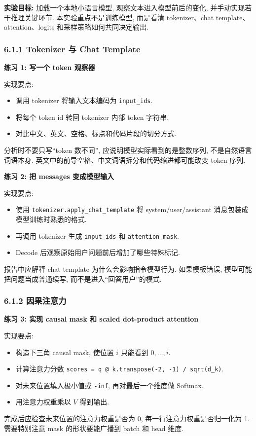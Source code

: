 \documentclass{../../nndlcourse}
\begin{document}
\textbf{实验目标: }加载一个本地小语言模型, 观察文本进入模型前后的变化, 并手动实现若干推理关键环节. 本实验重点不是训练模型, 而是看清 tokenizer、chat template、attention、logits 和采样策略如何共同决定输出.

\subsubsection*{6.1.1 Tokenizer 与 Chat Template}

\textbf{练习 1: 写一个 token 观察器}

实现要点:
\begin{itemize}
    \item 调用 tokenizer 将输入文本编码为 \texttt{input\_ids}.
    \item 将每个 token id 转回 tokenizer 内部 token 字符串.
    \item 对比中文、英文、空格、标点和代码片段的切分方式.
\end{itemize}
分析时不要只写``token 数不同'', 应说明模型实际看到的是整数序列, 不是自然语言词语本身. 英文中的前导空格、中文词语拆分和代码缩进都可能改变 token 序列.

\textbf{练习 2: 把 messages 变成模型输入}

实现要点:
\begin{itemize}
    \item 使用 \texttt{tokenizer.apply\_chat\_template} 将 system/user/assistant 消息包装成模型训练时熟悉的格式.
    \item 再调用 tokenizer 生成 \texttt{input\_ids} 和 \texttt{attention\_mask}.
    \item Decode 后观察原始用户问题前后增加了哪些特殊标记.
\end{itemize}
报告中应解释 chat template 为什么会影响指令模型行为. 如果模板错误, 模型可能把问题当成普通续写, 而不是进入``回答用户''的模式.

\subsubsection*{6.1.2 因果注意力}

\textbf{练习 3: 实现 causal mask 和 scaled dot-product attention}

实现要点:
\begin{itemize}
    \item 构造下三角 causal mask, 使位置 $i$ 只能看到 $0,\ldots,i$.
    \item 计算注意力分数 \texttt{scores = q @ k.transpose(-2, -1) / sqrt(d\_k)}.
    \item 对未来位置填入极小值或 \texttt{-inf}, 再对最后一个维度做 Softmax.
    \item 用注意力权重乘以 $V$ 得到输出.
\end{itemize}
完成后应检查未来位置的注意力权重是否为 0, 每一行注意力权重是否归一化为 1. 需要特别注意 mask 的形状要能广播到 batch 和 head 维度.
\end{document}
